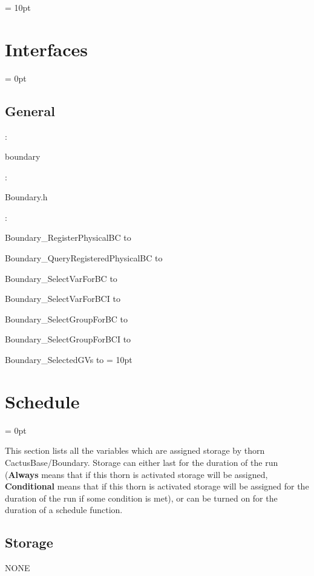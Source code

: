 \documentclass{article}
\begin{document}
\vspace{0.5cm}\parskip = 10pt 

\section{Interfaces} 


\parskip = 0pt

\vspace{3mm} \subsection*{General}

: 

boundary
\vspace{2mm}

\vspace{5mm}

: 



Boundary.h
\vspace{2mm}

: 



Boundary\_RegisterPhysicalBC to 

Boundary\_QueryRegisteredPhysicalBC to 

Boundary\_SelectVarForBC to 

Boundary\_SelectVarForBCI to 

Boundary\_SelectGroupForBC to 

Boundary\_SelectGroupForBCI to 

Boundary\_SelectedGVs to 
\vspace{2mm}\parskip = 10pt 

\section{Schedule} 


\parskip = 0pt


\noindent This section lists all the variables which are assigned storage by thorn CactusBase/Boundary.  Storage can either last for the duration of the run ({\bf Always} means that if this thorn is activated storage will be assigned, {\bf Conditional} means that if this thorn is activated storage will be assigned for the duration of the run if some condition is met), or can be turned on for the duration of a schedule function.


\subsection*{Storage}NONE
\end{document}
